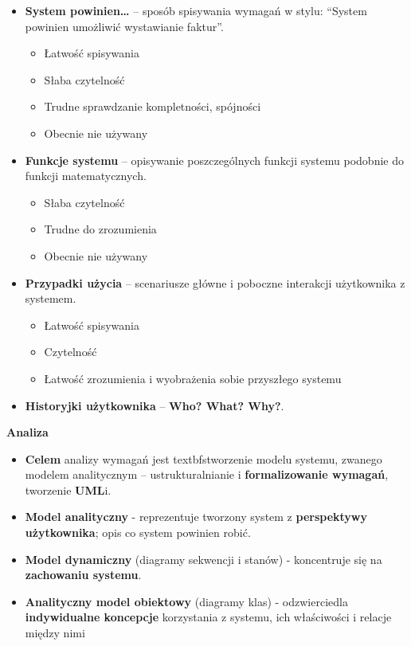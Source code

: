 \documentclass[main.tex]{subfiles}
\begin{document}
    \begin{itemize}
        \item \textbf{System powinien\ldots} -- sposób spisywania wymagań w stylu: ``System powinien umożliwić wystawianie
        faktur''.
        \begin{itemize}[noitemsep]
            \item Łatwość spisywania
            \item Słaba czytelność
            \item Trudne sprawdzanie kompletności, spójności
            \item Obecnie nie używany
        \end{itemize}

        \item \textbf{Funkcje systemu} -- opisywanie poszczególnych funkcji systemu podobnie do funkcji matematycznych.
        \begin{itemize}[noitemsep]
            \item Słaba czytelność
            \item Trudne do zrozumienia
            \item Obecnie nie używany
        \end{itemize}

        \item \textbf{Przypadki użycia} -- scenariusze główne i poboczne interakcji użytkownika z systemem.
        \begin{itemize}[noitemsep]
            \item Łatwość spisywania
            \item Czytelność
            \item Łatwość zrozumienia i wyobrażenia sobie przyszłego systemu
        \end{itemize}

        \item \textbf{Historyjki użytkownika} -- \textbf{Who? What? Why?}.
    \end{itemize}

    \noindent \textbf{Analiza}

    \begin{itemize}
        \item \textbf{Celem} analizy wymagań jest textbf{stworzenie modelu} systemu, zwanego modelem analitycznym --
        ustrukturalnianie i \textbf{formalizowanie wymagań}, tworzenie \textbf{UML}i.

        \item \textbf{Model analityczny} - reprezentuje tworzony system z \textbf{perspektywy użytkownika}; opis co system
        powinien robić.

        \item \textbf{Model dynamiczny} (diagramy sekwencji i stanów) - koncentruje się na \textbf{zachowaniu systemu}.

        \item \textbf{Analityczny model obiektowy} (diagramy klas) - odzwierciedla \textbf{indywidualne koncepcje}
        korzystania z systemu, ich właściwości i relacje między nimi
    \end{itemize}
\end{document}
